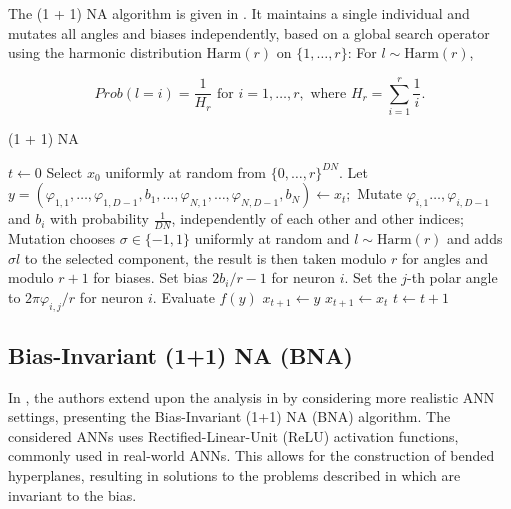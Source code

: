 The (1 + 1) NA algorithm is given in .
It maintains a single individual and mutates all angles and biases independently, based on a global search operator using the harmonic distribution
$\text{Harm}(r)$ on $\{1, \dots, r\}$: For $l \sim \text{Harm}(r)$,

\[
    Prob(l = i) = \frac{1}{H_r} \text{ for } i = 1, \dots, r, \text{ where } H_r = \sum_{i=1}^r \frac{1}{i}.
\]

\begin{algorithm}
\caption{(1 + 1) NA}
\label{alg:na}
\begin{algorithmic}
    \State $t \gets 0$
    \State Select $x_0$ uniformly at random from $\{0, \ldots, r\}^{DN}$.
        \State Let $y = (\varphi_{1,1}, \ldots, \varphi_{1,D-1}, b_1, \ldots, \varphi_{N,1}, \ldots, \varphi_{N,D-1}, b_N) \gets x_t;$
            \State Mutate $\varphi_{i,1} \dots, \varphi_{i,D-1}$ and $b_i$ with probability $\frac{1}{DN}$, independently of each other and other indices;
            \State Mutation chooses $\sigma \in \{-1, 1\}$ uniformly at random and $l \sim \text{Harm}(r)$ and adds $\sigma l$ to the selected component, the
            result is then taken modulo $r$ for angles and modulo $r + 1$ for biases.
                \State Set bias $2b_i / r - 1$ for neuron $i$.
                    \State Set the $j$-th polar angle to $2\pi \varphi_{i,j} / r$ for neuron $i$.
                \EndFor
            \EndFor
            \State Evaluate $f(y)$
                \State $x_{t+1} \gets y$
            \Else
                \State $x_{t+1} \gets x_t$
            \EndIf
        \EndFor
        \State $t \gets t + 1$
    \EndWhile
\end{algorithmic}
\end{algorithm}

\subsection{Bias-Invariant (1+1) NA (BNA)}

In \cite{bna}, the authors extend upon the analysis in \cite{na} by considering more realistic ANN settings, presenting the Bias-Invariant (1+1) NA (BNA) algorithm.
The considered ANNs uses Rectified-Linear-Unit (ReLU) activation functions, commonly used in real-world ANNs.
This allows for the construction of bended hyperplanes, resulting in solutions to the problems described in \cite{na} which are invariant to the bias.

